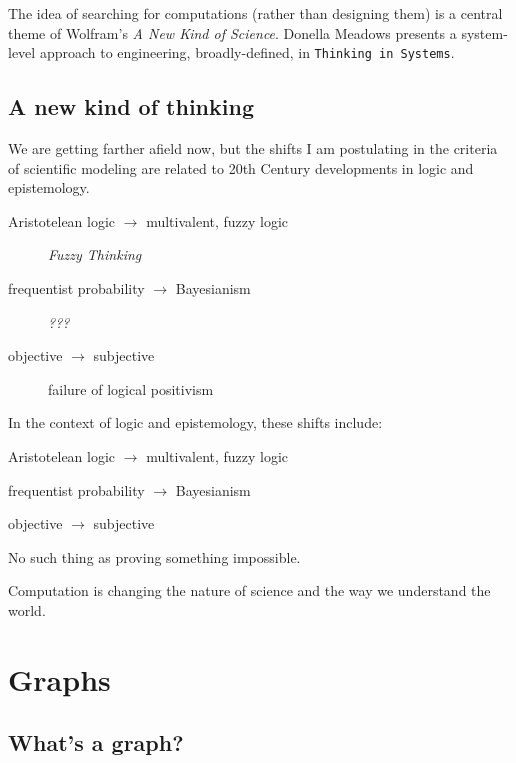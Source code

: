 \documentclass[10pt]{book}
\begin{document}
The idea of searching for computations (rather than designing them) is
a central theme of Wolfram's {\em A New Kind of Science}.  Donella
Meadows presents a system-level approach to engineering,
broadly-defined, in {\tt Thinking in Systems}.


\section{A new kind of thinking}

We are getting farther afield now, but the shifts I am postulating
in the criteria of scientific modeling are related to 20th Century
developments in logic and epistemology.

\begin{description}

\item[Aristotelean logic $\rightarrow$ multivalent, fuzzy logic] 
{\em Fuzzy Thinking}

\item[frequentist probability $\rightarrow$ Bayesianism] 
{\em ???}

\item[objective $\rightarrow$ subjective] 
failure of logical positivism


\end{description}







In the context of logic and epistemology, these shifts include:

Aristotelean logic $\rightarrow$ multivalent, fuzzy logic

frequentist probability $\rightarrow$ Bayesianism

objective $\rightarrow$ subjective


No such thing as proving something impossible.


Computation is changing the nature of science and the way we understand the world.



\chapter{Graphs}

\section{What's a graph?}
\end{document}
